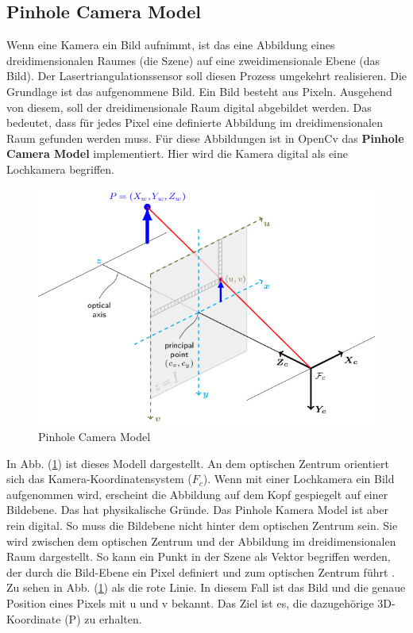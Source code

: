 	\subsection{Pinhole Camera Model}
	Wenn eine Kamera ein Bild aufnimmt, ist das eine Abbildung eines dreidimensionalen Raumes (die Szene) auf eine zweidimensionale Ebene (das Bild). Der Lasertriangulationssensor soll diesen Prozess umgekehrt realisieren. Die Grundlage ist das aufgenommene Bild. Ein Bild besteht aus Pixeln. Ausgehend von diesem, soll der dreidimensionale Raum digital abgebildet werden. Das bedeutet, dass für jedes Pixel eine definierte Abbildung im dreidimensionalen Raum gefunden werden muss. Für diese Abbildungen ist in OpenCv das \textbf{Pinhole Camera Model} implementiert. Hier wird die Kamera digital als eine Lochkamera begriffen. \newline
	\begin{figure}[h]
		\centering
		\includegraphics[width=0.7\linewidth]{img/grundlagen/pinhole_camera_model.png}
		\caption{Pinhole Camera Model}
		\label{fig:pinhole-camera-model}
	\end{figure}
	In Abb. (\ref{fig:pinhole-camera-model}) ist dieses Modell dargestellt. An dem optischen Zentrum orientiert sich das Kamera-Koordinatensystem (\( F_c \)). Wenn mit einer Lochkamera ein Bild aufgenommen wird, erscheint die Abbildung auf dem Kopf gespiegelt auf einer Bildebene. Das hat physikalische Gründe. Das Pinhole Kamera Model ist aber rein digital. So muss die Bildebene nicht hinter dem optischen Zentrum sein. Sie wird zwischen dem optischen Zentrum und der Abbildung im dreidimensionalen Raum dargestellt. So kann ein Punkt in der Szene als Vektor begriffen werden, der durch die Bild-Ebene ein Pixel definiert und zum optischen Zentrum führt \citep[vgl.][]{dawson-howe_simple_1994}. Zu sehen in Abb. (\ref{fig:pinhole-camera-model}) als die rote Linie. In diesem Fall ist das Bild und die genaue Position eines Pixels mit u und v bekannt. Das Ziel ist es, die dazugehörige 3D-Koordinate (P) zu erhalten.
	\newpage 
	
